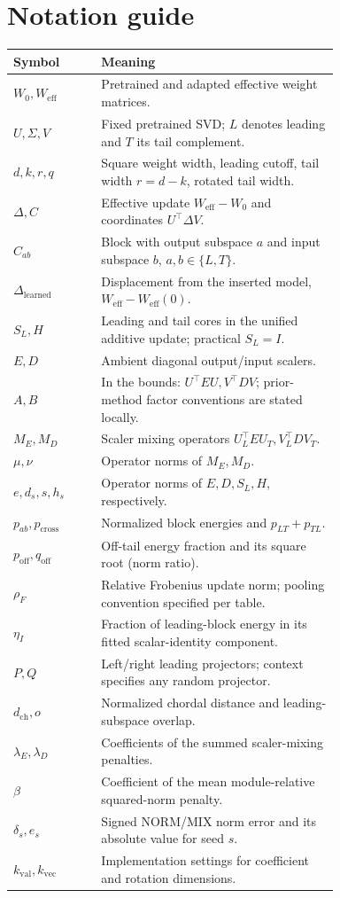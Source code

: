 \documentclass{article}
\newcommand{\off}{\mathrm{off}}
\newcommand{\cross}{\mathrm{cross}}
\begin{document}
\section*{Notation guide}
\begin{center}
\begin{tabular}{lp{0.73\linewidth}}
\toprule
Symbol & Meaning\\
\midrule
$W_0,W_{\mathrm{eff}}$ & Pretrained and adapted effective weight matrices.\\
$U,\Sigma,V$ & Fixed pretrained SVD; $L$ denotes leading and $T$ its tail complement.\\
$d,k,r,q$ & Square weight width, leading cutoff, tail width $r=d-k$, rotated tail width.\\
$\Delta,C$ & Effective update $W_{\mathrm{eff}}-W_0$ and coordinates $U^\top\Delta V$.\\
$C_{ab}$ & Block with output subspace $a$ and input subspace $b$, $a,b\in\{L,T\}$.\\
$\Delta_{\mathrm{learned}}$ & Displacement from the inserted model, $W_{\mathrm{eff}}-W_{\mathrm{eff}}(0)$.\\
$S_L,H$ & Leading and tail cores in the unified additive update; practical $S_L=I$.\\
$E,D$ & Ambient diagonal output/input scalers.\\
$A,B$ & In the bounds: $U^\top EU,V^\top DV$; prior-method factor conventions are stated locally.\\
$M_E,M_D$ & Scaler mixing operators $U_L^\top EU_T,V_L^\top DV_T$.\\
$\mu,\nu$ & Operator norms of $M_E,M_D$.\\
$e,d_s,s,h_s$ & Operator norms of $E,D,S_L,H$, respectively.\\
$p_{ab},p_\cross$ & Normalized block energies and $p_{LT}+p_{TL}$.\\
$p_\off,q_\off$ & Off-tail energy fraction and its square root (norm ratio).\\
$\rho_F$ & Relative Frobenius update norm; pooling convention specified per table.\\
$\eta_I$ & Fraction of leading-block energy in its fitted scalar-identity component.\\
$P,Q$ & Left/right leading projectors; context specifies any random projector.\\
$d_{\mathrm{ch}},o$ & Normalized chordal distance and leading-subspace overlap.\\
$\lambda_E,\lambda_D$ & Coefficients of the summed scaler-mixing penalties.\\
$\beta$ & Coefficient of the mean module-relative squared-norm penalty.\\
$\delta_s,e_s$ & Signed NORM/MIX norm error and its absolute value for seed $s$.\\
$k_{\mathrm{val}},k_{\mathrm{vec}}$ & Implementation settings for coefficient and rotation dimensions.\\
\bottomrule
\end{tabular}
\end{center}
\clearpage
\end{document}
